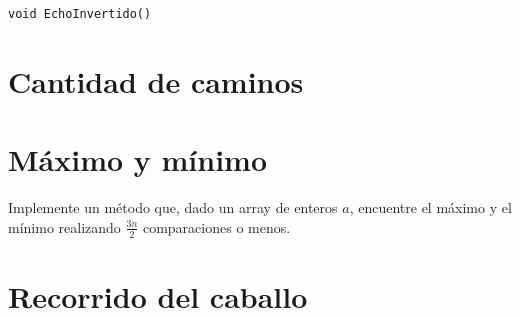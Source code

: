 \begin{verbatim}
void EchoInvertido()
\end{verbatim}
        
\section{Cantidad de caminos}


\section{Máximo y mínimo}
Implemente un método que, dado un array de enteros \(a\), encuentre el máximo y el mínimo realizando \(\frac{3 n}{2}\) comparaciones o menos.

\section{Recorrido del caballo}

